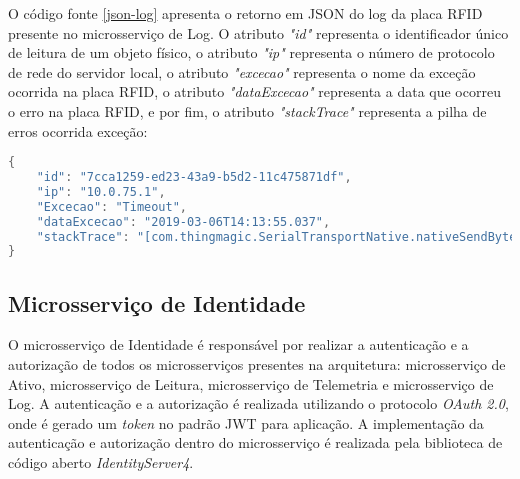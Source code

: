 O código fonte \ref{json-log} apresenta o retorno em \acrshort{JSON} do log da placa \acrshort{RFID} presente no microsserviço de Log. O atributo \textit{"id"} representa o identificador único de leitura de um objeto físico, o atributo \textit{"ip"} representa o número de protocolo de rede do servidor local, o atributo \textit{"excecao"} representa o nome da exceção ocorrida na placa \acrshort{RFID}, o atributo \textit{"dataExcecao"} representa a data que ocorreu o erro na placa \acrshort{RFID}, e por fim, o atributo \textit{"stackTrace"} representa a pilha de erros ocorrida exceção:

\begin{lstlisting}[language=Java, caption={JSON de resposta do microsserviço de Log.}, label=json-log]
{
    "id": "7cca1259-ed23-43a9-b5d2-11c475871df",
    "ip": "10.0.75.1",
    "Excecao": "Timeout",
    "dataExcecao": "2019-03-06T14:13:55.037",
    "stackTrace": "[com.thingmagic.SerialTransportNative.nativeSendBytes(Native Method), com.thingmagic.SerialTransportNative.sendBytes(SerialTransportNative.java:210), com.thingmagic.SerialReader.sendMessage(SerialReader.java:2159), com.thingmagic.SerialReader.sendTimeout(SerialReader.java:2326), com.thingmagic.SerialReader.sendOpcode(SerialReader.java:2384), com.thingmagic.SerialReader.cmdClearTagBuffer(SerialReader.java:4420), com.thingmagic.SerialReader.read(SerialReader.java:10890), com.rfid.reader.services.ReaderService.readDataTag(ReaderService.java:20), com.rfid.reader.events.ReaderMessageSender.run(ReaderMessageSender.java:26), java.util.concurrent.ThreadPoolExecutor.runWorker(ThreadPoolExecutor.java:1142), java.util.concurrent.ThreadPoolExecutor$Worker.run(ThreadPoolExecutor.java:617), java.lang.Thread.run(Thread.java:745)]"
}
\end{lstlisting}

\subsection{Microsserviço de Identidade}

O microsserviço de Identidade é responsável por realizar a autenticação e a autorização de todos os microsserviços presentes na arquitetura: microsserviço de Ativo, microsserviço de Leitura, microsserviço de Telemetria e microsserviço de Log. A autenticação e a autorização é realizada utilizando o protocolo \textit{OAuth 2.0}, onde é gerado um \textit{token} no padrão \acrshort{JWT} para aplicação. A implementação da autenticação e autorização dentro do microsserviço é realizada pela biblioteca de código aberto \textit{IdentityServer4}. 

